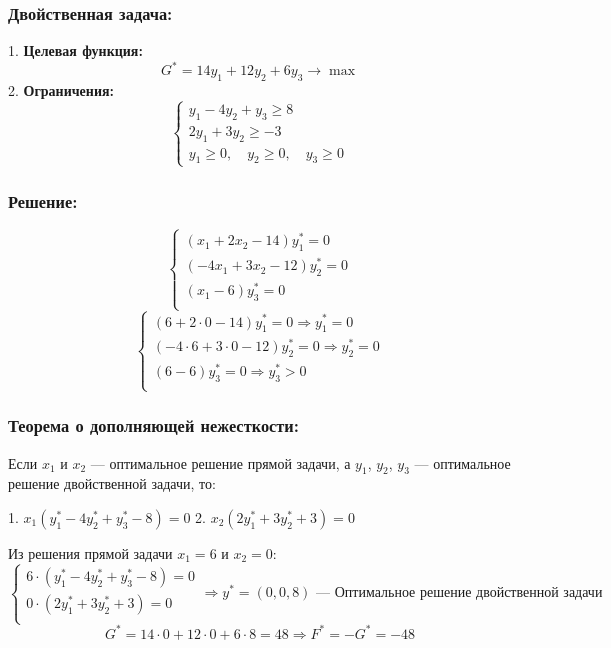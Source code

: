 \documentclass[17pt]{extarticle}
\begin{document}
\subsubsection*{Двойственная задача:}
1. \textbf{Целевая функция:}
\[
    G^* = 14y_1 + 12y_2 + 6y_3 \to \max
\]
2. \textbf{Ограничения:}
\[
    \begin{cases}
        y_1 - 4y_2 + y_3 \geq 8 \\
        2y_1 + 3y_2 \geq -3     \\
        y_1 \geq 0, \quad y_2 \geq 0, \quad y_3 \geq 0
    \end{cases}
\]

\subsubsection*{Решение:}
\[
    \begin{cases}
        (x_1 + 2x_2 - 14) y_1^* = 0   \\
        (-4x_1 + 3x_2 - 12) y_2^* = 0 \\
        (x_1 - 6) y_3^* = 0           \\
    \end{cases}
\]
\[
    \begin{cases}
        (6 + 2 \cdot 0 - 14) y_1^* = 0 \Rightarrow y_1^* = 0          \\
        (-4 \cdot 6 + 3 \cdot 0 - 12) y_2^* = 0 \Rightarrow y_2^* = 0 \\
        (6 - 6) y_3^* = 0 \Rightarrow y_3^* > 0                       \\
    \end{cases}
\]

\subsubsection*{Теорема о дополняющей нежесткости:}
Если \( x_1 \) и \( x_2 \) — оптимальное решение прямой задачи, а \( y_1 \), \( y_2 \), \( y_3 \) — оптимальное решение двойственной задачи, то:

1. \( x_1(y_1^* - 4y_2^* + y_3^* - 8) = 0 \)
2. \( x_2(2y_1^* + 3y_2^* + 3) = 0 \)

Из решения прямой задачи \( x_1 = 6 \) и \( x_2 = 0 \):
\[
    \begin{cases}
        6 \cdot (y_1^* - 4y_2^* + y_3^* - 8) = 0 \\
        0 \cdot (2y_1^* + 3y_2^* + 3) = 0        \\
    \end{cases}
    \Rightarrow y^* = (0, 0, 8) \text{ — Оптимальное решение двойственной задачи}
\]
\[
    G^* = 14 \cdot 0 + 12 \cdot 0 + 6 \cdot 8 = 48 \Rightarrow F^* = -G^* = -48
\]
\end{document}
